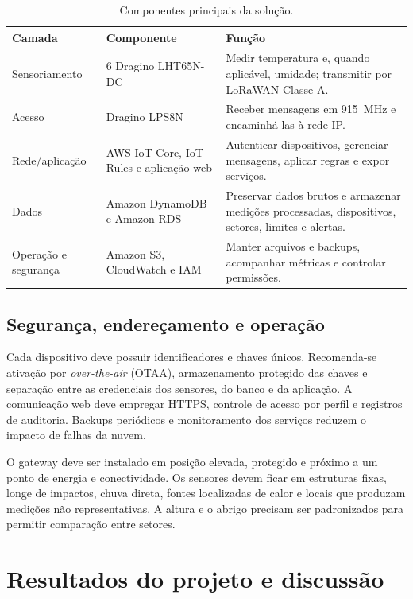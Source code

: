 \documentclass[10pt,a4paper,twocolumn]{article}
\begin{document}
\begin{table}[t]
\centering
\caption{Componentes principais da solução.}
\label{tab:componentes}
\begin{tabularx}{\textwidth}{@{}p{3.0cm}p{3.1cm}X@{}}
\toprule
\textbf{Camada} & \textbf{Componente} & \textbf{Função} \\
\midrule
Sensoriamento & 6 Dragino LHT65N-DC & Medir temperatura e, quando aplicável,
umidade; transmitir por LoRaWAN Classe A. \\
Acesso & Dragino LPS8N & Receber mensagens em \SI{915}{\mega\hertz} e
encaminhá-las à rede IP. \\
Rede/aplicação & AWS IoT Core, IoT Rules e aplicação web & Autenticar
dispositivos, gerenciar mensagens, aplicar regras e expor serviços. \\
Dados & Amazon DynamoDB e Amazon RDS & Preservar dados brutos e armazenar
medições processadas, dispositivos, setores, limites e alertas. \\
Operação e segurança & Amazon S3, CloudWatch e IAM & Manter arquivos e backups,
acompanhar métricas e controlar permissões. \\
\bottomrule
\end{tabularx}
\end{table}

\subsection{Segurança, endereçamento e operação}

Cada dispositivo deve possuir identificadores e chaves únicos. Recomenda-se
ativação por \textit{over-the-air} (OTAA), armazenamento protegido das chaves e
separação entre as credenciais dos sensores, do banco e da aplicação. A
comunicação web deve empregar HTTPS, controle de acesso por perfil e registros de
auditoria. Backups periódicos e monitoramento dos serviços reduzem o impacto de
falhas da nuvem.

O gateway deve ser instalado em posição elevada, protegido e próximo a um ponto
de energia e conectividade. Os sensores devem ficar em estruturas fixas, longe de
impactos, chuva direta, fontes localizadas de calor e locais que produzam
medições não representativas. A altura e o abrigo precisam ser padronizados para
permitir comparação entre setores.

\section{Resultados do projeto e discussão}
\end{document}
